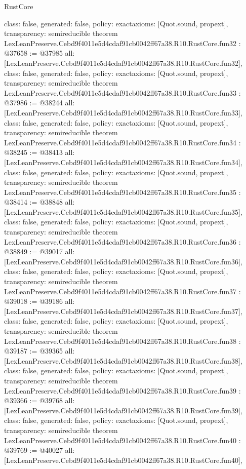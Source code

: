 \begin{lexlean}{RustCore}
\begin{coremodule}
{  class: false,
  generated: false,
  policy: exact{axioms: [Quot.sound, propext]},
  transparency: semireducible
}
theorem LexLeanPreserve.Cebd9f4011e5d4cdaf91cb0042ff67a38.R10.RustCore.fun32 : @37658 := @37985 {
  all: [LexLeanPreserve.Cebd9f4011e5d4cdaf91cb0042ff67a38.R10.RustCore.fun32],
  class: false,
  generated: false,
  policy: exact{axioms: [Quot.sound, propext]},
  transparency: semireducible
}
theorem LexLeanPreserve.Cebd9f4011e5d4cdaf91cb0042ff67a38.R10.RustCore.fun33 : @37986 := @38244 {
  all: [LexLeanPreserve.Cebd9f4011e5d4cdaf91cb0042ff67a38.R10.RustCore.fun33],
  class: false,
  generated: false,
  policy: exact{axioms: [Quot.sound, propext]},
  transparency: semireducible
}
theorem LexLeanPreserve.Cebd9f4011e5d4cdaf91cb0042ff67a38.R10.RustCore.fun34 : @38245 := @38413 {
  all: [LexLeanPreserve.Cebd9f4011e5d4cdaf91cb0042ff67a38.R10.RustCore.fun34],
  class: false,
  generated: false,
  policy: exact{axioms: [Quot.sound, propext]},
  transparency: semireducible
}
theorem LexLeanPreserve.Cebd9f4011e5d4cdaf91cb0042ff67a38.R10.RustCore.fun35 : @38414 := @38848 {
  all: [LexLeanPreserve.Cebd9f4011e5d4cdaf91cb0042ff67a38.R10.RustCore.fun35],
  class: false,
  generated: false,
  policy: exact{axioms: [Quot.sound, propext]},
  transparency: semireducible
}
theorem LexLeanPreserve.Cebd9f4011e5d4cdaf91cb0042ff67a38.R10.RustCore.fun36 : @38849 := @39017 {
  all: [LexLeanPreserve.Cebd9f4011e5d4cdaf91cb0042ff67a38.R10.RustCore.fun36],
  class: false,
  generated: false,
  policy: exact{axioms: [Quot.sound, propext]},
  transparency: semireducible
}
theorem LexLeanPreserve.Cebd9f4011e5d4cdaf91cb0042ff67a38.R10.RustCore.fun37 : @39018 := @39186 {
  all: [LexLeanPreserve.Cebd9f4011e5d4cdaf91cb0042ff67a38.R10.RustCore.fun37],
  class: false,
  generated: false,
  policy: exact{axioms: [Quot.sound, propext]},
  transparency: semireducible
}
theorem LexLeanPreserve.Cebd9f4011e5d4cdaf91cb0042ff67a38.R10.RustCore.fun38 : @39187 := @39365 {
  all: [LexLeanPreserve.Cebd9f4011e5d4cdaf91cb0042ff67a38.R10.RustCore.fun38],
  class: false,
  generated: false,
  policy: exact{axioms: [Quot.sound, propext]},
  transparency: semireducible
}
theorem LexLeanPreserve.Cebd9f4011e5d4cdaf91cb0042ff67a38.R10.RustCore.fun39 : @39366 := @39768 {
  all: [LexLeanPreserve.Cebd9f4011e5d4cdaf91cb0042ff67a38.R10.RustCore.fun39],
  class: false,
  generated: false,
  policy: exact{axioms: [Quot.sound, propext]},
  transparency: semireducible
}
theorem LexLeanPreserve.Cebd9f4011e5d4cdaf91cb0042ff67a38.R10.RustCore.fun40 : @39769 := @40027 {
  all: [LexLeanPreserve.Cebd9f4011e5d4cdaf91cb0042ff67a38.R10.RustCore.fun40],
}
\end{coremodule}
\end{lexlean}
